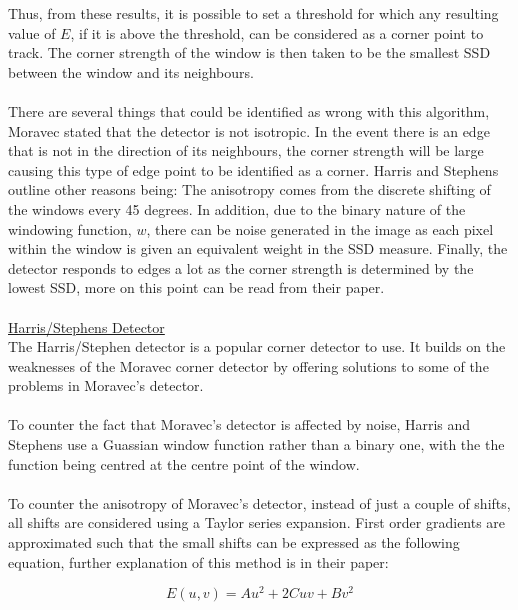 \documentclass[11pt]{article}
\begin{document}
Thus, from these results, it is possible to set a threshold for which 
any resulting value of $E$, if it is above the threshold, can be considered
as a corner point to track. The corner strength of the window is then
taken to be the smallest SSD between the window and its neighbours.\\
\\
There are several things that could be identified as wrong with this 
algorithm, Moravec stated that the detector is not isotropic. In the
event there is an edge that is not in the direction of its neighbours,
the corner strength will be large
causing this type of edge point to be identified as a corner. Harris
and Stephens outline other reasons being:
The anisotropy comes from the discrete shifting of the windows every 45 
degrees. In addition, due to the binary nature of the windowing 
function, $w$, there can be noise generated in the image as each 
pixel within the window is given an equivalent weight in the SSD measure.
Finally, the detector responds to edges a lot as the corner strength
is determined by the lowest SSD, more on this point can be read from
their paper\cite{Harris88}.\\
\\
\underline{Harris/Stephens Detector}\\
The Harris/Stephen detector is a popular corner detector to use. It builds
on the weaknesses of the Moravec corner detector by offering solutions
to some of the problems in Moravec's detector.\\
\\
To counter the fact that Moravec's detector is affected by noise, Harris
and Stephens use a Guassian window function rather than a binary one,
with the the function being centred at the centre point of the window.\\
\\
To counter the anisotropy of Moravec's detector, instead of just a couple of 
shifts, all shifts are considered using a Taylor series expansion. First
order gradients are approximated such that the small shifts can be expressed
as the following equation, further explanation of this method is
in their paper\cite{Harris88}:

\begin{equation}
	E(u,v) = Au^2 + 2Cuv + Bv^2
\end{equation} 
\end{document}
